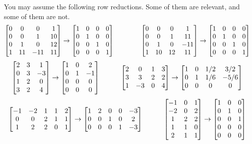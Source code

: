 \documentclass[a4paper]{article}
\begin{document}
\begin{problem}[2012-13 resit]
 You may assume the following row reductions.  Some of them are
 relevant, and some of them are not.  
 \[ \left[\begin{matrix} 0&0&0&1\\ 0&0&1&10\\ 0&1&0&12\\ 1&11&-11&11\\ \end{matrix}\right] \to 
    \left[\begin{matrix} 1&0&0&0\\ 0&1&0&0\\ 0&0&1&0 \\ 0&0&0&1 \end{matrix}\right] \hspace{4em}
    \left[\begin{matrix} 0&0&0&1\\ 0&0&1&11\\ 0&1&0&-11\\ 1&10&12&11 \end{matrix}\right] \to
    \left[\begin{matrix} 1&0&0&0\\ 0&1&0&0\\ 0&0&1&0 \\ 0&0&0&1 \end{matrix}\right]
 \]
 \[
 \left[\begin{matrix} 2&3&1\\ 0&3&-3\\ 1&2&0\\ 3&2&4\\ \end{matrix}\right] \to
 \left[\begin{matrix} 1&0&2\\ 0&1&-1\\ 0&0&0\\ 0&0&0\\ \end{matrix}\right] \hspace{3em}
 \left[\begin{matrix} 2&0&1&3\\ 3&3&2&2\\ 1&-3&0&4\\ \end{matrix}\right] \to
 \left[\begin{matrix} 1&0&1/2&3/2\\ 0&1&1/6&-5/6\\ 0&0&0&0\\ \end{matrix}\right]
 \]
 \[
 \left[\begin{matrix} -1&-2&1&1&2\\ 0&0&2&1&1\\ 1&2&2&0&1\\ \end{matrix}\right] \to
 \left[\begin{matrix} 1&2&0&0&-3\\ 0&0&1&0&2\\ 0&0&0&1&-3\\ \end{matrix}\right] \hspace{3em}
 \left[\begin{matrix} -1&0&1\\ -2&0&2\\ 1&2&2\\ 1&1&0\\ 2&1&1\\ \end{matrix}\right] \to
 \left[\begin{matrix} 1&0&0\\ 0&1&0\\ 0&0&1\\ 0&0&0\\ 0&0&0\\ \end{matrix}\right]
\]
\end{problem}
\end{document}
